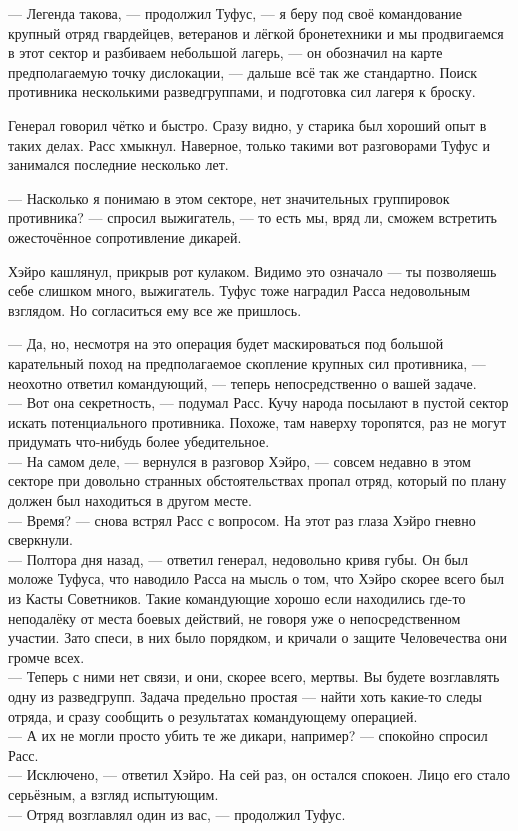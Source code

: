 \noindent --- Легенда такова, --- продолжил Туфус, --- я беру под своё 
командование крупный отряд гвардейцев, ветеранов и лёгкой бронетехники и мы 
продвигаемся в этот сектор и разбиваем небольшой лагерь, --- он обозначил на 
карте предполагаемую точку дислокации, --- дальше всё так же стандартно. Поиск 
противника несколькими разведгруппами, и подготовка сил лагеря к броску.

Генерал говорил чётко и быстро. Сразу видно, у старика был хороший опыт в таких делах. Расс хмыкнул. Наверное, только такими вот разговорами Туфус и занимался последние несколько лет.

\noindent --- Насколько я понимаю в этом секторе, нет значительных группировок 
противника? --- спросил выжигатель, --- то есть мы, вряд ли, сможем встретить 
ожесточённое сопротивление дикарей.

Хэйро кашлянул, прикрыв рот кулаком. Видимо это означало --- ты позволяешь 
себе слишком много, выжигатель. Туфус тоже наградил Расса недовольным взглядом. 
Но согласиться ему все же пришлось.

\noindent --- Да, но, несмотря на это операция будет маскироваться под большой 
карательный поход на предполагаемое скопление крупных сил противника, --- 
неохотно ответил командующий, --- теперь непосредственно о вашей задаче.\\
--- Вот она секретность, --- подумал Расс. Кучу народа посылают в пустой сектор 
искать потенциального противника. Похоже, там наверху торопятся, раз не могут 
придумать что-нибудь более убедительное.\\
--- На самом деле, --- вернулся в разговор Хэйро, --- совсем недавно в этом 
секторе при довольно странных обстоятельствах пропал отряд, который по плану 
должен был находиться в другом месте.\\
--- Время? --- снова встрял Расс с вопросом. На этот раз глаза Хэйро гневно 
сверкнули.\\
--- Полтора дня назад, --- ответил генерал, недовольно кривя губы. Он был 
моложе Туфуса, что наводило Расса на мысль о том, что Хэйро скорее всего был из 
Касты Советников. Такие командующие хорошо если находились где-то неподалёку от 
места боевых действий, не говоря уже о непосредственном участии. Зато спеси, в 
них было порядком, и кричали о защите Человечества они громче всех.\\
--- Теперь с ними нет связи, и они, скорее всего, мертвы. Вы будете возглавлять 
одну из разведгрупп. Задача предельно простая --- найти хоть какие-то следы 
отряда, и сразу сообщить о результатах командующему операцией.\\
--- А их не могли просто убить те же дикари, например? --- спокойно спросил 
Расс. \\
--- Исключено, --- ответил Хэйро. На сей раз, он остался спокоен. Лицо его 
стало серьёзным, а взгляд испытующим.\\
--- Отряд возглавлял один из вас, --- продолжил Туфус.\\

